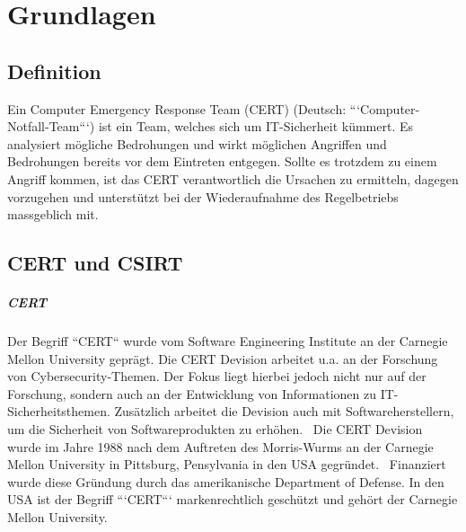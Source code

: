 
\chapter{Grundlagen}  %

\ifpdf
    \graphicspath{{Figs/Raster/}{Figs/PDF/}{Figs/}}
\else
    \graphicspath{{Figs/Vector/}{Figs/}}
\fi



\section{Definition}
Ein Computer Emergency Response Team (CERT) (Deutsch: ```Computer-Notfall-Team```) ist ein Team, welches sich um IT-Sicherheit kümmert. Es analysiert mögliche Bedrohungen und wirkt möglichen Angriffen und Bedrohungen bereits vor dem Eintreten entgegen. Sollte es trotzdem zu einem Angriff kommen, ist das CERT verantwortlich die Ursachen zu ermitteln, dagegen vorzugehen und unterstützt bei der Wiederaufnahme des Regelbetriebs massgeblich mit.

\section{CERT und CSIRT}
\paragraph{CERT}Der Begriff ``CERT`` wurde vom Software Engineering Institute an der Carnegie Mellon University geprägt. Die CERT Devision arbeitet u.a. an der Forschung von Cybersecurity-Themen. Der Fokus liegt hierbei jedoch nicht nur auf der Forschung, sondern auch an der Entwicklung von Informationen zu IT-Sicherheitsthemen. Zusätzlich arbeitet die Devision auch mit Softwareherstellern, um die Sicherheit von Softwareprodukten zu erhöhen.~\citep{cert} Die CERT Devision wurde im Jahre 1988 nach dem Auftreten des Morris-Wurms an der Carnegie Mellon University in Pittsburg, Pensylvania in den USA gegründet.~\citep{homonym} Finanziert wurde diese Gründung durch das amerikanische Department of Defense. In den USA ist der Begriff ```CERT``` markenrechtlich geschützt und gehört der Carnegie Mellon University.
